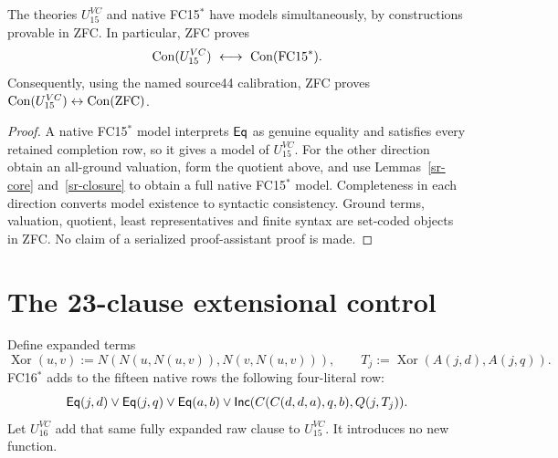 \begin{srtheorem}\label{sr-main}
The theories $U_{15}^{VC}$ and native FC15$^*$ have models simultaneously,
by constructions provable in ZFC. In particular, ZFC proves
\[
\srCon(U_{15}^{VC})\ \longleftrightarrow\ \srCon(\mathrm{FC15}^*).
\]
Consequently, using the named source44 calibration, ZFC proves
$\operatorname{Con}(U_{15}^{VC})\leftrightarrow\operatorname{Con}(\mathrm{ZFC})$.
\end{srtheorem}
\begin{proof}
A native FC15$^*$ model interprets $\mathsf{Eq}$ as genuine equality and satisfies
every retained completion row, so it gives a model of $U_{15}^{VC}$. For
the other direction obtain an all-ground valuation, form the quotient
above, and use Lemmas~\ref{sr-core} and~\ref{sr-closure} to obtain a full
native FC15$^*$ model. Completeness in each direction converts model
existence to syntactic consistency. Ground terms, valuation, quotient,
least representatives and finite syntax are set-coded objects in ZFC.
No claim of a serialized proof-assistant proof is made.
\end{proof}

\section{The 23-clause extensional control}

Define expanded terms
\[
\operatorname{Xor}(u,v):=N(N(u,N(u,v)),N(v,N(u,v))),\qquad
T_j:=\operatorname{Xor}(A(j,d),A(j,q)).
\]
FC16$^*$ adds to the fifteen native rows the following four-literal row:
\begin{equation}\label{sr-ext-row}
\mathsf{Eq}(j,d)\lor\mathsf{Eq}(j,q)\lor\mathsf{Eq}(a,b)
 \lor\mathsf{Inc}(C(C(d,d,a),q,b),Q(j,T_j)).
\end{equation}
Let $U_{16}^{VC}$ add that same fully expanded raw clause to
$U_{15}^{VC}$. It introduces no new function.

